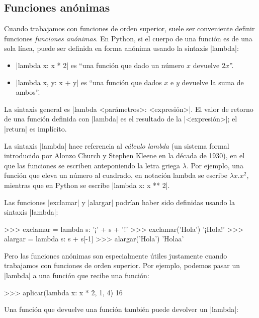 \begin{subappendices}
\subsection*{Funciones anónimas}

Cuando trabajamos con funciones de orden superior, suele ser conveniente
definir funciones \emph{funciones anónimas}. En Python, si el cuerpo de una
función es de una sola línea, puede ser definida en forma anónima usando la
sintaxis |lambda|:

\begin{itemize}
\item |lambda x: x * 2| es ``una función que dado un número $x$ devuelve $2x$''.
\item |lambda x, y: x + y| es ``una función que dados $x$ e $y$ devuelve la suma de ambos''.
\end{itemize}

La sintaxis general es |lambda <parámetros>: <expresión>|. El valor de retorno de una
función definida con |lambda| es el resultado de la |<expresión>|; el |return| es
implícito.

\begin{sabias_que}
La sintaxis |lambda| hace referencia al \emph{cálculo lambda} (un sistema
formal introducido por Alonzo Church y Stephen Kleene en la década de 1930),
en el que las funciones se escriben anteponiendo la letra griega $\lambda$. Por
ejemplo, una función que eleva un número al cuadrado, en notación lambda se escribe
$\lambda x. x^2$, mientras que en Python se escribe |lambda x: x ** 2|.
\end{sabias_que}

Las funciones |exclamar| y |alargar| podrían haber sido definidas usando la
sintaxis |lambda|:

\begin{codigo-python-sn}
>>> exclamar = lambda s: '¡' + s + '!'
>>> exclamar('Hola')
'¡Hola!'
>>> alargar = lambda s: s + s[-1]
>>> alargar('Hola')
'Holaa'
\end{codigo-python-sn}

Pero las funciones anónimas son especialmente útiles justamente cuando
trabajamos con funciones de orden superior. Por ejemplo, podemos pasar un |lambda| a
una función que recibe una función:

\begin{codigo-python-sn}
>>> aplicar(lambda x: x * 2, 1, 4)
16
\end{codigo-python-sn}

Una función que devuelve una función también puede devolver un |lambda|:


\end{subappendices}
